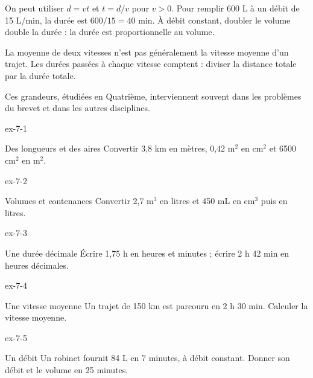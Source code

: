 \begin{savoirfaire}On peut utiliser $d=vt$ et $t=d/v$ pour $v>0$. Pour remplir 600 L à un débit de 15 L/min, la durée est $600/15=40$ min. À débit constant, doubler le volume double la durée : la durée est proportionnelle au volume.\end{savoirfaire}
\begin{attention}La moyenne de deux vitesses n’est pas généralement la vitesse moyenne d’un trajet. Les durées passées à chaque vitesse comptent : diviser la distance totale par la durée totale.\end{attention}
Ces grandeurs, étudiées en Quatrième, interviennent souvent dans les problèmes du brevet et dans les autres disciplines.
\clearpage{}
\begin{blocLivre}{ex-7-1}\begin{exercice}[1]{Des longueurs et des aires}
Convertir 3,8 km en mètres, 0,42 m$^2$ en cm$^2$ et 6500 cm$^2$ en m$^2$.
\end{exercice}\end{blocLivre}
\begin{blocLivre}{ex-7-2}\begin{exercice}[1]{Volumes et contenances}
Convertir 2,7 m$^3$ en litres et 450 mL en cm$^3$ puis en litres.
\end{exercice}\end{blocLivre}
\begin{blocLivre}{ex-7-3}\begin{exercice}[1]{Une durée décimale}
Écrire 1,75 h en heures et minutes ; écrire 2 h 42 min en heures décimales.
\end{exercice}\end{blocLivre}
\begin{blocLivre}{ex-7-4}\begin{exercice}[1]{Une vitesse moyenne}
Un trajet de 150 km est parcouru en 2 h 30 min. Calculer la vitesse moyenne.
\end{exercice}\end{blocLivre}
\begin{blocLivre}{ex-7-5}\begin{exercice}[1]{Un débit}
Un robinet fournit 84 L en 7 minutes, à débit constant. Donner son débit et le volume en 25 minutes.
\end{exercice}\end{blocLivre}

